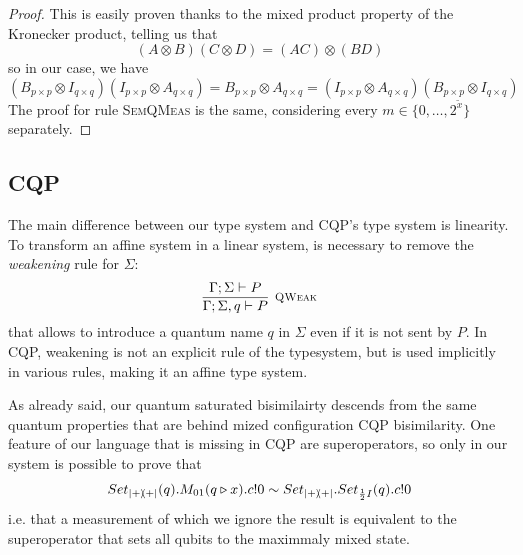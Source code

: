 \begin{proof}
	This is easily proven thanks to the mixed product property of the Kronecker product, telling us that 
	\[ (A \otimes B)(C \otimes D) = (AC)\otimes(BD)
	\]
	so in our case, we have 
	\[
	(B_{p\times p} \otimes I_{q\times q}) (I_{p\times p} \otimes A_{q\times q}) = B_{p\times p} \otimes A_{q \times q} = (I_{p\times p} \otimes A_{q\times q}) (B_{p\times p} \otimes I_{q\times q})
	\]	
The proof for rule {\scshape SemQMeas} is the same, considering every $m \in \{0, \dots, 2^{\widetilde{x}}\}$ separately.
\end{proof}



\subsection{CQP}
The main difference between our type system and CQP's type system is linearity. 
To transform an affine system in a linear system, is necessary to remove the \textit{weakening} rule for $\Sigma$:
\[ \infer[\mbox{\footnotesize\scshape QWeak}]{\Gamma; \Sigma,q \vdash P}{\Gamma; \Sigma \vdash P}
\]
that allows to introduce a quantum name $q$ in $\Sigma$ even if it is not sent by $P$. In CQP, weakening is not an explicit rule of the typesystem, but is used implicitly in various rules, making it an affine type system.

As already said, our quantum saturated bisimilairty descends from the same quantum properties that are behind mized configuration CQP bisimilarity. One feature of our language that is missing in CQP are superoperators, so only in our system is possible to prove that 
\begin{align*}
	Set_{\ket{+}\!\!\bra{+}}(q).M_{01}(q \triangleright x).c!0 \sim Set_{\ket{+}\!\!\bra{+}}.Set_{\frac{1}{2} I}(q).c!0
\end{align*}
i.e. that a measurement of which we ignore the result is equivalent to the superoperator that sets all qubits to the maximmaly mixed state.